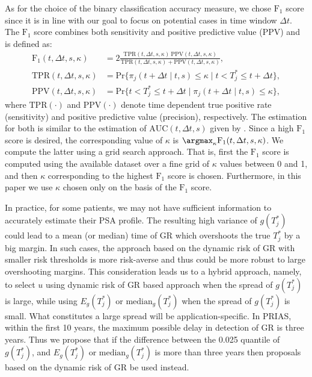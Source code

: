 As for the choice of the binary classification accuracy measure, we chose $\mbox{F}_1$ score since it is in line with our goal to focus on potential cases in time window $\Delta t$. The $\mbox{F}_1$ score combines both sensitivity and positive predictive value (PPV) and is defined as:
\begin{align*}
\mbox{F}_1(t, \Delta t, s, \kappa) &= 2\frac{\mbox{TPR}(t, \Delta t, s, \kappa)\ \mbox{PPV}(t, \Delta t, s, \kappa)}{\mbox{TPR}(t, \Delta t, s, \kappa) + \mbox{PPV}(t, \Delta t, s, \kappa)},\\
\mbox{TPR}(t, \Delta t, s, \kappa) &= \mbox{Pr}\big\{\pi_j(t + \Delta t \mid t,s) \leq \kappa \mid t < T^*_j \leq t + \Delta t\big\},\\
\mbox{PPV}(t, \Delta t, s, \kappa) &= \mbox{Pr}\big\{t < T^*_j \leq t + \Delta t \mid \pi_j(t + \Delta t \mid t,s) \leq \kappa \big\},
\end{align*}
where $\mbox{TPR}(\cdot)$ and $\mbox{PPV}(\cdot)$ denote time dependent true positive rate (sensitivity) and positive predictive value (precision), respectively. The estimation for both is similar to the estimation of $\mbox{AUC}(t, \Delta t, s)$ given by \citet{landmarking2017}. Since a high $\mbox{F}_1$ score is desired, the corresponding value of $\kappa$ is $\argmax_{\kappa} \mbox{F}_1(t, \Delta t, s, \kappa)$. We compute the latter using a grid search approach. That is, first the $\mbox{F}_1$ score is computed using the available dataset over a fine grid of $\kappa$ values between 0 and 1, and then $\kappa$ corresponding to the highest $\mbox{F}_1$ score is chosen. Furthermore, in this paper we use $\kappa$ chosen only on the basis of the $\mbox{F}_1$ score.




In practice, for some patients, we may not have sufficient information to accurately estimate their PSA profile. The resulting high variance of $g(T^*_j)$ could lead to a mean (or median) time of GR which overshoots the true $T_j^*$ by a big margin. In such cases, the approach based on the dynamic risk of GR with smaller risk thresholds is more risk-averse and thus could be more robust to large overshooting margins. This consideration leads us to a hybrid approach, namely, to select $u$ using dynamic risk of GR based approach when the spread of $g(T_j^*)$ is large, while using $E_g(T^*_j)$ or $\mbox{median}_g(T^*_j)$ when the spread of $g(T_j^*)$ is small. What constitutes a large spread will be application-specific. In PRIAS, within the first 10 years, the maximum possible delay in detection of GR is three years. Thus we propose that if the difference between the 0.025 quantile of $g(T^*_j)$, and $E_g(T^*_j)$ or $\mbox{median}_g(T^*_j)$ is more than three years then proposals based on the dynamic risk of GR be used instead.

